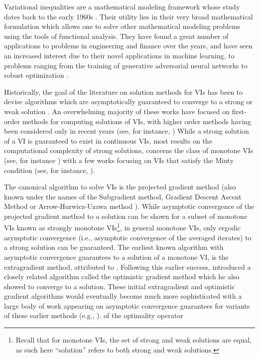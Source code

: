 Variational inequalities \cite{facchinei2003finite} are a mathematical modeling framework whose study dates back to the early 1960s \cite{lions1967variational, hartman1966some, browder1965nonlinear, grioli1973proprieta, brezis2011methodes}. Their utility lies in their very broad mathematical formulation which allows one to solve other mathematical modeling problems using the tools of functional analysis. They have found a great number of applications to problems in engineering and finance \cite{facchinei2003finite} over the years, and have seen an increased interest due to their novel applications in machine learning, to problems ranging from the training of generative adversarial neural networks \cite{goodfellow2014gan} to robust optimization \cite{ben2009robust}.


Historically, the goal of the literature on solution methods for VIs has been to devise algorithms which are asymptotically guaranteed to converge to a strong or weak solution \cite{brezis2011functional}. An overwhelming majority of these works have focused on first-order methods for computing solutions of VIs, with higher order methods having been considered only in recent years (see, for instance, \citet{he2022convergence, huang2022approximation})
While a strong solution of a VI is guaranteed to exist in continuous VIs, most results on the computational complexity of strong solutions, concerns the class of monotone VIs (see, for instance \citet{cai2022tight}) with a few works focusing on VIs that satisfy the Minty condition (see, for instance, \citet{diakonikolas2020halpern}). 

The canonical algorithm to solve VIs is the projected gradient method \cite{cauchy1847methode, nesterov1998introductory} (also known under the names of the Subgradient method, Gradient Descent Ascent Method or Arrow-Hurwicz-Uzawa method \cite{arrow-hurwicz, arrow1958studies}). While asymptotic convergence of the projected gradient method to a solution can be shown for a subset of monotone VIs known as strongly monotone VIs\footnote{Recall that for monotone VIs, the set of strong and weak solutions are equal, as such here ``solution'' refers to both strong and weak solutions.}, in general monotone VIs, only ergodic asymptotic convergence (i.e., asymptotic convergence of the averaged iterates) to a strong solution can be guaranteed.
The earliest known algorithm with asymptotic convergence guarantees to a solution of a monotone VI, is the extragradient method, attributed to \citet{korpelevich1976extragradient}. Following this earlier success, \citet{popov1980modification} introduced a closely related algorithm called the optimistic gradient method which he also showed to converge to a solution. These initial extragradient and optimistic gradient algorithms would eventually become much more sophisticated with a large body of work appearing on  asymptotic convergence guarantees for variants of these earlier methods (e.g., \cite{solodov1999hybrid}).
of the optimality operator

